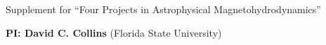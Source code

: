 \documentclass[11pt]{NSF}  %
\begin{document}
\begin{centering}
\begin{LARGE}
Supplement for ``Four Projects in Astrophysical Magnetohydrodynamics''
\end{LARGE}


\vspace{2mm}
{\bf PI: David C. Collins} (Florida State University)

\end{centering}
\pagestyle{plain}


\def\request{4477 SUs}




%



\end{document}
